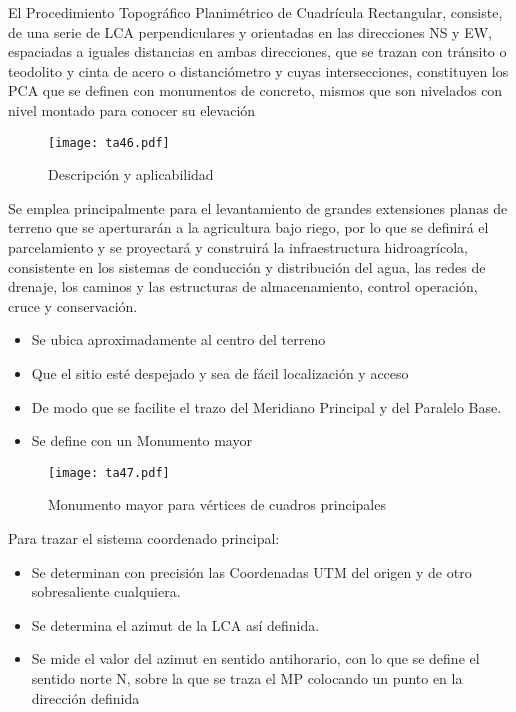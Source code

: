 El Procedimiento Topográfico Planimétrico de Cuadrícula Rectangular, consiste, de una serie de LCA perpendiculares y orientadas en las direcciones NS y EW, espaciadas a iguales distancias en ambas direcciones, que se trazan con tránsito o teodolito y cinta de acero o distanciómetro y cuyas intersecciones, constituyen los PCA que se definen con monumentos de concreto, mismos que son nivelados con nivel montado para conocer su elevación
\begin{figure}[h!]
\centering
  \texttt{[image: ta46.pdf]}
  \caption{Descripción y aplicabilidad}
  \label{ta46}
\end{figure}
Se emplea principalmente para el levantamiento de grandes extensiones planas de terreno que se aperturarán a la agricultura bajo riego, por lo que se definirá el parcelamiento y se proyectará y construirá la infraestructura hidroagrícola, consistente en los sistemas de conducción y distribución del agua, las redes de drenaje, los caminos y las estructuras de almacenamiento, control operación, cruce y conservación.

\begin{itemize}
    \item Se ubica aproximadamente al centro del terreno
    \item Que el sitio esté despejado y sea de fácil localización y acceso
    \item De modo que se facilite el trazo del Meridiano Principal y del Paralelo Base.
    \item Se define con un Monumento mayor
\end{itemize}
\begin{figure}[h!]
\centering
  \texttt{[image: ta47.pdf]}
  \caption{Monumento mayor para vértices de cuadros principales}
  \label{ta47}
\end{figure}

Para trazar el sistema coordenado principal:
\begin{itemize}
    \item Se determinan con precisión las Coordenadas UTM del origen y de otro sobresaliente cualquiera.
    \item Se determina el azimut de la LCA así definida.
    \item Se mide el valor del azimut en sentido antihorario, con lo que se define el sentido norte N, sobre la que se traza el MP colocando un punto en la dirección definida
\end{itemize}


